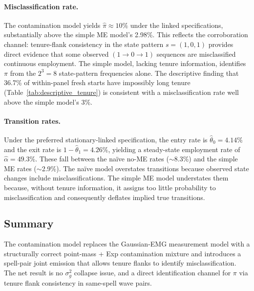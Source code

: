 \paragraph{Misclassification rate.}
The contamination model yields $\hat\pi \approx 10\%$ under the linked
specifications, substantially above the simple ME model's 2.98\%. This
reflects the corroboration channel: tenure-flank consistency in the state
pattern $s = (1,0,1)$ provides direct evidence that some observed
$(1 \to 0 \to 1)$ sequences are misclassified continuous employment. The
simple model, lacking tenure information, identifies $\pi$ from the
$2^3 = 8$ state-pattern frequencies alone. The descriptive finding that
36.7\% of within-panel fresh starts have impossibly long tenure
(Table~\ref{tab:descriptive_tenure}) is consistent with a
misclassification rate well above the simple model's 3\%.

\paragraph{Transition rates.}
Under the preferred stationary-linked specification, the entry rate is
$\hat\theta_0 = 4.14\%$ and the exit rate is
$1 - \hat\theta_1 = 4.26\%$, yielding a steady-state employment rate of
$\hat\alpha = 49.3\%$. These fall between the na\"ive no-ME rates
($\sim$8.3\%) and the simple ME rates ($\sim$2.9\%). The na\"ive model
overstates transitions because observed state changes include
misclassifications. The simple ME model understates them because, without
tenure information, it assigns too little probability to misclassification
and consequently deflates implied true transitions.


\subsection{Summary}

The contamination model replaces the Gaussian-EMG measurement model with a structurally
correct point-mass + Exp contamination mixture and introduces a spell-pair
joint emission that allows tenure flanks to identify misclassification.
The net result is no
\(\sigma_g^2\) collapse issue, and a direct identification channel for
\(\pi\) via tenure flank consistency in same-spell wave pairs.

